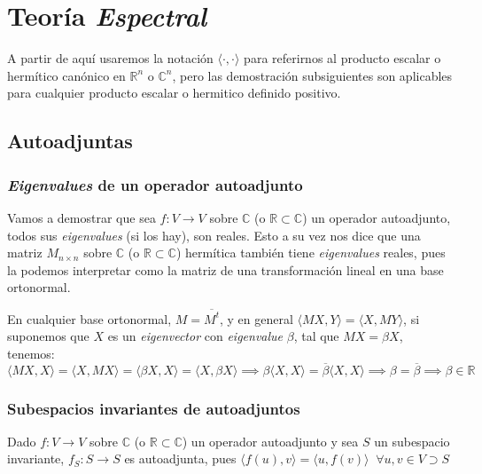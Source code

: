 \documentclass{preset}
\newcommand{\compconj}[1]{%
  \overline{#1}%
}
\begin{document}
\vspace{-20pt}
\section{Teoría \textit{Espectral}}
A partir de aquí usaremos la notación $\langle\cdot{,}\cdot\rangle$ para referirnos al producto escalar o hermítico canónico en $\mathbb{R}^n$ o $\mathbb{C}^n$, pero las demostración subsiguientes son aplicables para cualquier producto escalar o hermitico definido positivo.

\vspace{-15pt}
\subsection{Autoadjuntas}


\subsubsection{\textit{Eigenvalues} de un operador autoadjunto}

Vamos a demostrar que sea $f: V \rightarrow V$ sobre $\mathbb{C}$ (o $\mathbb{R} \subset \mathbb{C}$) un operador autoadjunto, todos sus \textit{eigenvalues} (si los hay), son reales. Esto a su vez nos dice que una matriz $M_{n \times n}$ sobre $\mathbb{C}$ (o $\mathbb{R} \subset \mathbb{C}$) hermítica también tiene \textit{eigenvalues} reales, pues la podemos interpretar como la matriz de una transformación lineal en una base ortonormal.

En cualquier base ortonormal, $M=\compconj{M^t}$, y en general $\langle MX {,} Y \rangle=\langle X {,} MY \rangle$, si suponemos que $X$ es un \textit{eigenvector} con \textit{eigenvalue} $\beta$, tal que $MX=\beta X$, tenemos:
\[\langle MX {,} X \rangle=\langle X {,} MX \rangle=\langle \beta X {,} X \rangle=\langle X {,} \beta X \rangle \implies \beta \langle X {,} X \rangle=\compconj{\beta} \langle X {,} X \rangle \implies \beta = \compconj{\beta} \implies \beta \in \mathbb{R}\]

\vspace{-15pt}
\subsubsection{Subespacios invariantes de autoadjuntos}

Dado $f: V \rightarrow V$ sobre $\mathbb{C}$ (o $\mathbb{R} \subset \mathbb{C}$) un operador autoadjunto y sea $S$ un subespacio invariante, $f_S : S \rightarrow S$ es autoadjunta, pues $\langle f(u) {,} v \rangle=\langle u {,} f(v) \rangle \;\; \forall u,v \in V \supset S$ 
\end{document}
